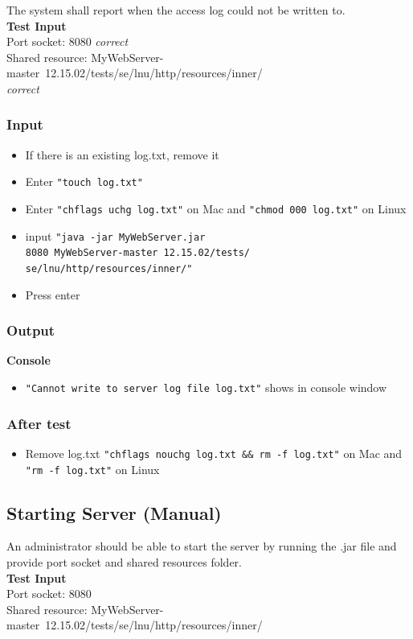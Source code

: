 \documentclass[a4paper, 12pt]{article}
\begin{document}
The system shall report when the access log could not be written to.\\
\textbf{Test Input} \\ Port socket: 8080 \textit{correct} \\ Shared resource: MyWebServer-master\ 12.15.02/tests/se/lnu/http/resources/inner/ \\ \textit{correct}
 
\subsubsection{Input}
\begin{itemize}
\item If there is an existing log.txt, remove it
\item Enter \texttt{"touch log.txt"}
\item Enter \texttt{"chflags uchg log.txt"} on Mac and \texttt{"chmod 000 log.txt"} on Linux
\item input \texttt{"java -jar MyWebServer.jar \\ 8080 MyWebServer-master\ 12.15.02/tests/\\se/lnu/http/resources/inner/"}
\item Press enter
\end{itemize} 

\subsubsection{Output}
\textbf{Console}
\begin{itemize}
\item \texttt{"Cannot write to server log file log.txt"} shows in console window
\end{itemize}

\subsubsection{After test}
\begin{itemize}
\item Remove log.txt \texttt{"chflags nouchg log.txt \&\& rm -f log.txt"} on Mac and \texttt{"rm -f log.txt"} on Linux
\end{itemize}

\subsection{Starting Server (Manual)}

An administrator should be able to start the server by running the .jar file and provide port socket and shared resources folder.\\
\textbf{Test Input} \\ Port socket: 8080 \\ Shared resource: MyWebServer-master\ 12.15.02/tests/se/lnu/http/resources/inner/
\end{document}
